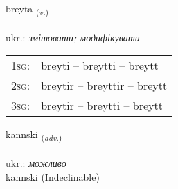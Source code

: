 \documentclass[frontgrid, backgrid]{flacards}\usepackage[]{graphicx}\usepackage[]{xcolor}
\begin{document}
\renewcommand{\blhead}{\vskip5pt {\small\bfseries\footnotesize Sagnorð | дієслово }}
\renewcommand{\bcfoot}{\vskip5pt \hspace{2pt}{\small\bfseries\footnotesize 1K}}


{breyta \small{\textsubscript{(\textit{v.})}} \\[1ex] %
\textphonetic{[preiːta]} \\
ukr.: \emph{змінювати; модифікувати} \\  [2ex]
\renewcommand*{\arraystretch}{0.8}
\begin{tabular}{p{1cm}l}
\textsc{1sg}: & breyti -- breytti -- breytt \\ 
\textsc{2sg}: & breytir -- breyttir -- breytt \\ 
\textsc{3sg}: & breytir -- breytti -- breytt \\ 
\end{tabular}
}


\renewcommand{\flhead}{\vskip5pt \fboxsep=0pt {\small\bfseries\footnotesize Atviksorð | прислівник}}
\renewcommand{\fcfoot}{\vskip5pt \fboxsep=0pt \hspace{2pt}{\small\bfseries\footnotesize 1K}}

\renewcommand{\blhead}{\vskip5pt {\small\bfseries\footnotesize Atviksorð | прислівник }}
\renewcommand{\bcfoot}{\vskip5pt \hspace{2pt}{\small\bfseries\footnotesize 1K}}


{kannski \small{\textsubscript{(\textit{adv.})}} \\[1ex]
\textphonetic{[kʰanscɪ]} \\
ukr.: \emph{можливо} \\  [2ex]
kannski (Indeclinable)}

\renewcommand{\flhead}{\vskip5pt \fboxsep=0pt {\small\bfseries\footnotesize Nafnorð | іменник}}
\renewcommand{\fcfoot}{\vskip5pt \fboxsep=0pt \hspace{2pt}{\small\bfseries\footnotesize 1K}}
\end{document}
